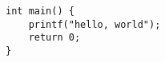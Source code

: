 \documentclass{article}
\begin{document}
\begin{verbatim}
int main() {
	printf("hello, world");
	return 0;
}
\end{verbatim}
\end{document}
